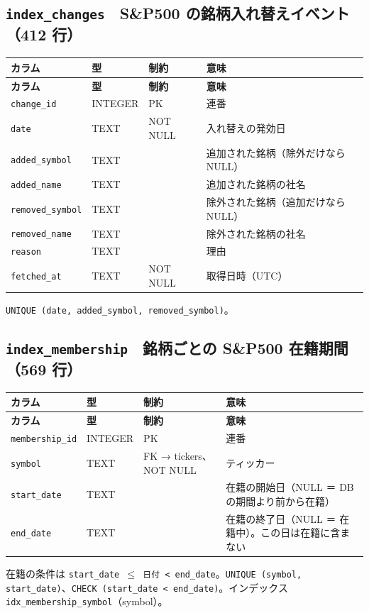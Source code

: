 \documentclass[xelatex,ja=standard,jafont=hiragino-pron,a4paper,10pt]{bxjsreport}
\begin{document}
\subsection*{\texttt{index\_\allowbreak{}changes}　S\&P500 の銘柄入れ替えイベント（412 行）}
{\footnotesize
\begin{longtable}{p{3.30cm}p{1.40cm}p{3.00cm}p{6.40cm}}
\toprule
\textbf{カラム} & \textbf{型} & \textbf{制約} & \textbf{意味} \\
\midrule
\endfirsthead
\toprule
\textbf{カラム} & \textbf{型} & \textbf{制約} & \textbf{意味} \\
\midrule
\endhead
\bottomrule
\endfoot
\texttt{change\_\allowbreak{}id} & INTEGER & PK & 連番 \\
\texttt{date} & TEXT & NOT NULL & 入れ替えの発効日 \\
\texttt{added\_\allowbreak{}symbol} & TEXT &  & 追加された銘柄（除外だけなら NULL） \\
\texttt{added\_\allowbreak{}name} & TEXT &  & 追加された銘柄の社名 \\
\texttt{removed\_\allowbreak{}symbol} & TEXT &  & 除外された銘柄（追加だけなら NULL） \\
\texttt{removed\_\allowbreak{}name} & TEXT &  & 除外された銘柄の社名 \\
\texttt{reason} & TEXT &  & 理由 \\
\texttt{fetched\_\allowbreak{}at} & TEXT & NOT NULL & 取得日時（UTC） \\
\end{longtable}
}
{\small \texttt{UNIQUE (date, added\_\allowbreak{}symbol, removed\_\allowbreak{}symbol)}。\par}
\medskip
\subsection*{\texttt{index\_\allowbreak{}membership}　銘柄ごとの S\&P500 在籍期間（569 行）}
{\footnotesize
\begin{longtable}{p{3.30cm}p{1.40cm}p{3.00cm}p{6.40cm}}
\toprule
\textbf{カラム} & \textbf{型} & \textbf{制約} & \textbf{意味} \\
\midrule
\endfirsthead
\toprule
\textbf{カラム} & \textbf{型} & \textbf{制約} & \textbf{意味} \\
\midrule
\endhead
\bottomrule
\endfoot
\texttt{membership\_\allowbreak{}id} & INTEGER & PK & 連番 \\
\texttt{symbol} & TEXT & FK → tickers、NOT NULL & ティッカー \\
\texttt{start\_\allowbreak{}date} & TEXT &  & 在籍の開始日（NULL ＝ DB の期間より前から在籍） \\
\texttt{end\_\allowbreak{}date} & TEXT &  & 在籍の終了日（NULL ＝ 在籍中）。この日は在籍に含まない \\
\end{longtable}
}
{\small 在籍の条件は \texttt{start\_\allowbreak{}date $\leq$ 日付 \textless{} end\_\allowbreak{}date}。\texttt{UNIQUE (symbol, start\_\allowbreak{}date)}、\texttt{CHECK (start\_\allowbreak{}date \textless{} end\_\allowbreak{}date)}。インデックス \texttt{idx\_\allowbreak{}membership\_\allowbreak{}symbol}（symbol）。\par}
\medskip
\end{document}
